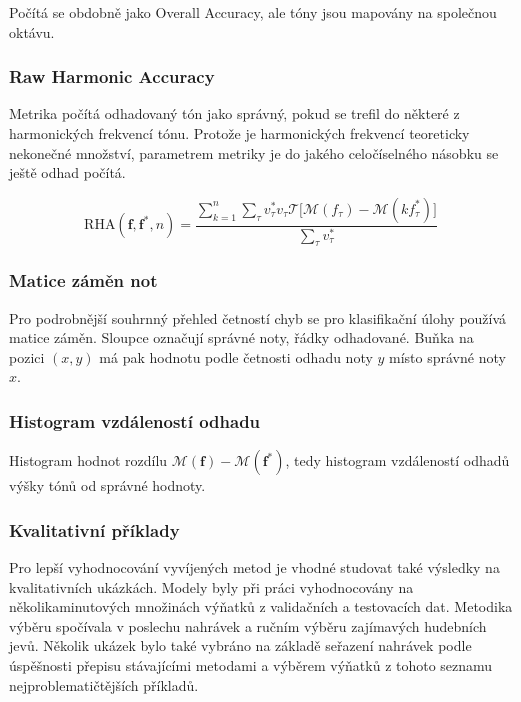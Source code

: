 Počítá se obdobně jako Overall Accuracy, ale tóny jsou mapovány na společnou oktávu.

\subsubsection{Raw Harmonic Accuracy}

Metrika počítá odhadovaný tón jako správný, pokud se trefil do některé z harmonických frekvencí tónu. Protože je harmonických frekvencí teoreticky nekonečné množství, parametrem metriky je do jakého celočíselného násobku se ještě odhad počítá.

    $$\mathrm{RHA}(\mathbf{f}, \mathbf{f^*}, n) = \frac{\sum_{k=1}^n \sum_\tau{v^*_\tau v_\tau \mathcal{T}[\mathcal{M}(f_\tau) - \mathcal{M}(k f^*_\tau)} ] }{\sum_\tau{v^*_\tau}}$$

\subsubsection{Matice záměn not}

Pro podrobnější souhrnný přehled četností chyb se pro klasifikační úlohy používá matice záměn. Sloupce označují správné noty, řádky odhadované. Buňka na pozici $(x,y)$ má pak hodnotu podle četnosti odhadu noty $y$ místo správné noty $x$.

\subsubsection{Histogram vzdáleností odhadu}

Histogram hodnot rozdílu $\mathcal{M}(\mathbf{f}) - \mathcal{M}(\mathbf{f^*})$, tedy histogram vzdáleností odhadů výšky tónů od správné hodnoty.


\subsubsection{Kvalitativní příklady}

Pro lepší vyhodnocování vyvíjených metod je vhodné studovat také výsledky na kvalitativních ukázkách. Modely byly při práci vyhodnocovány na několikaminutových množinách výňatků z validačních a testovacích dat. Metodika výběru spočívala v poslechu nahrávek a ručním výběru zajímavých hudebních jevů. Několik ukázek bylo také vybráno na základě seřazení nahrávek podle úspěšnosti přepisu stávajícími metodami a výběrem výňatků z tohoto seznamu nejproblematičtějších příkladů.



